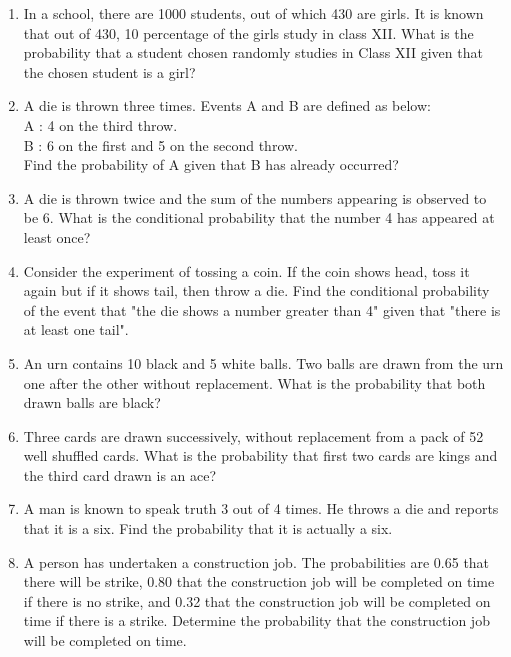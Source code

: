 \begin{enumerate}[label=\thesection.\arabic*.,ref=\thesection.\theenumi]
\item In a school, there are 1000 students, out of which 430 are girls. It is known that out of 430,  10 percentage of the girls study in class XII. What is the probability that a student chosen randomly studies in Class XII given that the chosen student is a girl?\\

\item A die is thrown three times. Events A and B are defined as below:\\
A : 4 on the third throw.\\
B : 6 on the first and 5 on the second throw.\\
Find the probability of A given that B has already occurred?\\

\item A die is thrown twice and the sum of the numbers appearing is observed to be 6. What is the conditional probability that the number 4 has appeared at least once?\\

\item Consider the experiment of tossing a coin. If the coin shows head, toss it again but if it shows tail, then throw a die. Find the conditional probability of the event that "the die shows a number greater than 4" given that "there is at least one tail".\\

\item An urn contains 10 black and 5 white balls. Two balls are drawn from the urn one after the other without replacement. What is the probability that both drawn balls are black?\\

\item Three cards are drawn successively, without replacement from a pack of 52 well shuffled cards. What is the probability that first two cards are kings and the third card drawn is an ace?\\

\item A man is known to speak truth 3 out of 4 times. He throws a die and reports that it is a six. Find the probability that it is actually a six.\\

\item A person has undertaken a construction job. The probabilities are 0.65 that there will be strike, 0.80 that the construction job will be completed on time if there is no strike, and 0.32 that the construction job will be completed on time if there is a strike. Determine the probability that the construction job will be completed on time.\\
\solution



\end{enumerate}
